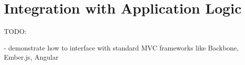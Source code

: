 
\section{Integration with Application Logic}

TODO:

- demonstrate how to interface with standard MVC frameworks like Backbone, Ember.js, Angular
